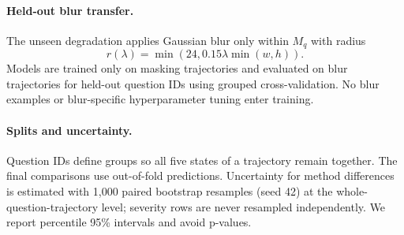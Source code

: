\paragraph{Held-out blur transfer.}
The unseen degradation applies Gaussian blur only within $M_q$ with radius
\begin{equation}
r(\lambda)=\min\left(24,0.15\lambda\min(w,h)\right).
\end{equation}
Models are trained only on masking trajectories and evaluated on blur trajectories for held-out question IDs using grouped cross-validation. No blur examples or blur-specific hyperparameter tuning enter training.

\paragraph{Splits and uncertainty.}
Question IDs define groups so all five states of a trajectory remain together. The final comparisons use out-of-fold predictions. Uncertainty for method differences is estimated with 1,000 paired bootstrap resamples (seed 42) at the whole-question-trajectory level; severity rows are never resampled independently. We report percentile 95\% intervals and avoid p-values.
